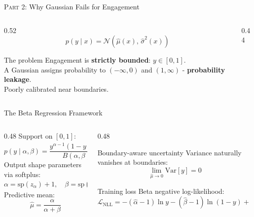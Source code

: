 \documentclass[aspectratio=169]{beamer}
\newcommand{\hl}[1]{\textcolor{coolpurple}{\textbf{#1}}}
\begin{document}
	\begin{frame}{\textsc{Part 2:} Why Gaussian Fails for Engagement}
		\begin{columns}[onlytextwidth]
			\begin{column}{0.52\textwidth}
				$$ p(y \mid x) = \mathcal{N}(\hat{\mu}(x),\, \hat{\sigma}^2(x)) $$
				\begin{alertblock}{The problem}
					\small Engagement is \textbf{strictly bounded}: $y \in [0,1]$. \\
					A Gaussian assigns probability to $(-\infty, 0)$ and $(1, \infty)$ - \hl{probability leakage}. \\
					Poorly calibrated near boundaries.
				\end{alertblock}
			\end{column}
			\begin{column}{0.44\textwidth}
				\centering
			\end{column}
		\end{columns}
	\end{frame}
	
	\begin{frame}{The Beta Regression Framework}
		\small
		\begin{columns}[onlytextwidth]
			\begin{column}{0.48\textwidth}
				Support on $[0,1]$:
				$$ p(y \mid \alpha, \beta) = \frac{y^{\alpha-1}(1-y)^{\beta-1}}{B(\alpha,\beta)} $$
				Output shape parameters via softplus:
				$$ \alpha = \text{sp}(z_\alpha)+1, \quad \beta = \text{sp}(z_\beta)+1 $$
				Predictive mean:
				$$ \hat{\mu} = \frac{\alpha}{\alpha+\beta} $$
			\end{column}
			\begin{column}{0.48\textwidth}
				\begin{block}{Boundary-aware uncertainty}
					\footnotesize
					Variance naturally vanishes at boundaries:
					$$ \lim_{\hat{\mu}\to 0}\mathrm{Var}[y] = 0 $$
				\end{block}
				\begin{block}{Training loss}
					\footnotesize
					Beta negative log-likelihood:
					$$ \mathcal{L}_{\text{NLL}} = -(\hat{\alpha}-1)\ln y - (\hat{\beta}-1)\ln(1-y) + \ln B(\hat{\alpha},\hat{\beta}) $$
				\end{block}
			\end{column}
		\end{columns}
	\end{frame}
	
\end{document}
